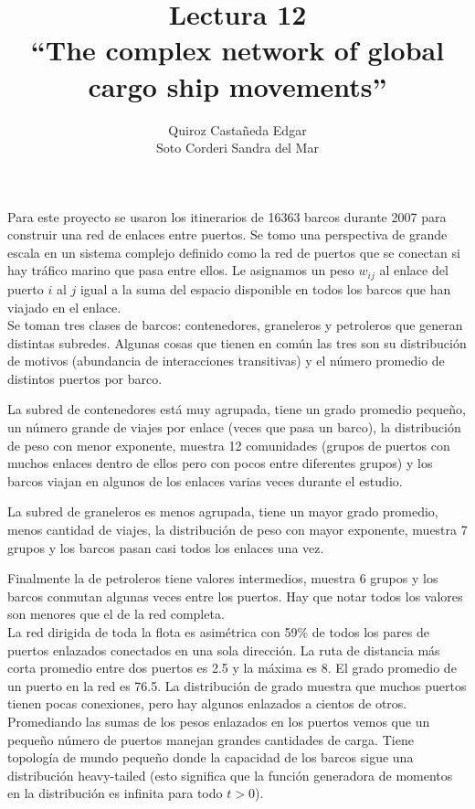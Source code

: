 \documentclass[12pt]{extreport}
\title{
	Lectura 12\\ 
	``The complex network of global cargo ship movements''
	}
\author{
	Quiroz Castañeda Edgar \\
	Soto Corderi Sandra del Mar
	}
\makeatletter
\renewcommand{\maketitle}{
	\bgroup\setlength{\parindent}{0pt}

	\begin{flushright}
		\@author
	\end{flushright}

	\begin{flushleft}
		\textbf{\@title}
	\end{flushleft}

	\egroup
}
\makeatother
\begin{document}
	\maketitle
	
	Para este proyecto se usaron los itinerarios de 16363 barcos durante 2007 para construir una red de enlaces entre puertos.
	Se tomo una perspectiva de grande escala en un sistema complejo definido como la red de puertos que se conectan si hay tráfico marino que pasa entre ellos. Le asignamos un peso $w_{ij}$ al enlace del puerto $i$ al $j$ igual a la suma del espacio disponible en todos los barcos que han viajado en el enlace.\\
		
	Se toman tres clases de barcos: contenedores, graneleros y petroleros que generan distintas subredes. Algunas cosas que tienen en común las tres son su distribución de motivos (abundancia de interacciones transitivas) y el número promedio de distintos puertos por barco.
	
	La subred de contenedores está muy agrupada, tiene un grado promedio pequeño, un número grande de viajes por enlace (veces que pasa un barco), la distribución de peso con menor exponente, muestra 12 comunidades (grupos de puertos con muchos enlaces dentro de ellos pero con pocos entre diferentes grupos) y los barcos viajan en algunos de los enlaces varias veces durante el estudio.
	
	La subred de graneleros es menos agrupada, tiene un mayor grado promedio, menos cantidad de viajes, la distribución de peso con mayor exponente, muestra 7 grupos y los barcos pasan casi todos los enlaces una vez.
	
	Finalmente la de petroleros tiene valores intermedios, muestra 6 grupos y los barcos conmutan algunas veces entre los puertos. 
	Hay que notar todos los valores son menores que el de la red completa.\\
			
	La red dirigida de toda la flota es asimétrica con 59\% de todos los pares de puertos enlazados conectados en una sola dirección. La ruta de distancia más corta promedio entre dos puertos es 2.5 y la máxima es 8. El grado promedio de un puerto en la red es 76.5. La distribución de grado muestra que muchos puertos tienen pocas conexiones, pero hay algunos enlazados a cientos de otros. Promediando las sumas de los pesos enlazados en los puertos vemos que un pequeño número de puertos manejan grandes cantidades de carga. Tiene topología de mundo pequeño donde la capacidad de los barcos sigue una distribución heavy-tailed (esto significa que la función generadora de momentos en la distribución es infinita para todo $t > 0$).\\
	
\end{document}
